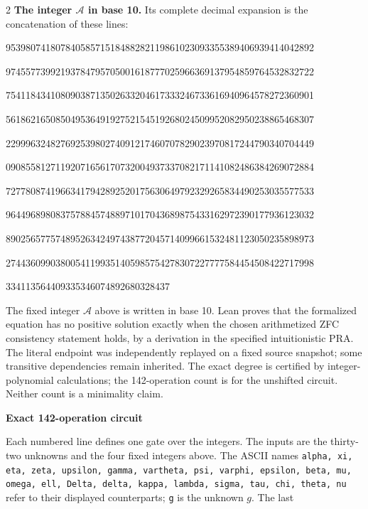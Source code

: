 \documentclass[10pt]{article}
\begin{document}
\begin{multicols}{2}
\textbf{The integer $\mathcal A$ in base 10.}
Its complete decimal expansion is the concatenation of these lines:\par
\begingroup\fontsize{7.7}{8.2}\selectfont{}\par
95398074180784058571518488282119861023093355389406939414042892\par
97455773992193784795705001618777025966369137954859764532832722\par
75411843410809038713502633204617333246733616940964578272360901\par
56186216508504953649192752154519268024509952082950238865468307\par
22999632482769253980274091217460707829023970817244790340704449\par
09085581271192071656170732004937337082171141082486384269072884\par
72778087419663417942892520175630649792329265834490253035577533\par
96449689808375788457488971017043689875433162972390177936123032\par
89025657757489526342497438772045714099661532481123050235898973\par
27443609903800541199351405985754278307227777584454508422717998\par
334113564409335346074892680328437\par
\endgroup
\normalfont\fontsize{7.7}{8.2}\selectfont
The fixed integer $\mathcal A$ above is written in base 10. Lean proves that the formalized equation has no positive solution exactly
when the chosen arithmetized ZFC consistency statement holds, by a derivation
in the specified intuitionistic PRA. The literal endpoint was independently
replayed on a fixed source snapshot; some transitive dependencies remain
inherited. The exact degree is certified by integer-polynomial calculations;
the 142-operation count is for the unshifted circuit. Neither count is a
minimality claim.
\end{multicols}
\clearpage
\begin{center}{\large\bfseries Exact 142-operation circuit}\end{center}
Each numbered line defines one gate over the integers. The inputs are the
thirty-two unknowns and the four fixed integers above. The ASCII names
\texttt{alpha, xi, eta, zeta, upsilon, gamma, vartheta, psi, varphi, epsilon, beta, mu, omega, ell, Delta, delta, kappa, lambda, sigma, tau, chi, theta, nu}
refer to their displayed counterparts; \texttt{g} is the unknown $g$. The last
\end{document}
